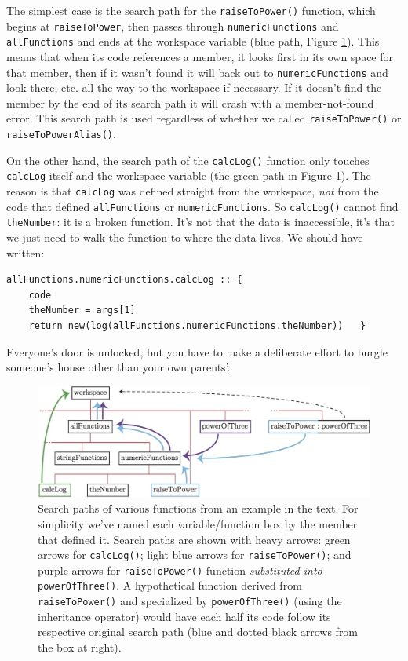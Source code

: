 \documentclass{article}
\newenvironment{code}{
       \begin{list}{}{
               \setlength{\leftmargin}{.4in}
               \setlength{\rightmargin}{0in}
               \setlength{\topsep}{.2in}
       }
       \small
       \item[] }
       { \end{list}   }
\begin{document}
\noindent The simplest case is the search path for the \verb#raiseToPower()# function, which begins at \verb#raiseToPower#, then passes through \verb#numericFunctions# and \verb#allFunctions# and ends at the workspace variable (blue path, Figure \ref{searchPaths}).  This means that when its code references a member, it looks first in its own space for that member, then if it wasn't found it will back out to \verb#numericFunctions# and look there; etc. all the way to the workspace if necessary.  If it doesn't find the member by the end of its search path it will crash with a member-not-found error.  This search path is used regardless of whether we called \verb#raiseToPower()# or \verb#raiseToPowerAlias()#.

On the other hand, the search path of the \verb#calcLog()# function only touches \verb#calcLog# itself and the workspace variable (the green path in Figure \ref{searchPaths}).  The reason is that \verb#calcLog# was defined straight from the workspace, \emph{not} from the code that defined \verb#allFunctions# or \verb#numericFunctions#.  So \verb#calcLog()# cannot find \verb#theNumber#:  it is a broken function.  It's not that the data is inaccessible, it's that we just need to walk the function to where the data lives.  We should have written:

\begin{code} \begin{verbatim}
allFunctions.numericFunctions.calcLog :: {
    code
    theNumber = args[1]
    return new(log(allFunctions.numericFunctions.theNumber))   }
\end{verbatim} \end{code}

\noindent Everyone's door is unlocked, but you have to make a deliberate effort to burgle someone's house other than your own parents'.

\begin{figure}
\centering
\includegraphics[width=\textwidth]{searchPaths}
\caption{Search paths of various functions from an example in the text.  For simplicity we've named each variable/function box by the member that defined it.  Search paths are shown with heavy arrows:  green arrows for \texttt{calcLog()}; light blue arrows for \texttt{raiseToPower()}; and purple arrows for \texttt{raiseToPower()} function \emph{substituted into} \texttt{powerOfThree()}.  A hypothetical function derived from \texttt{raiseToPower()} and specialized by \texttt{powerOfThree()} (using the inheritance operator) would have each half its code follow its respective original search path (blue and dotted black arrows from the box at right).}
\label{searchPaths}
\end{figure}
\end{document}
